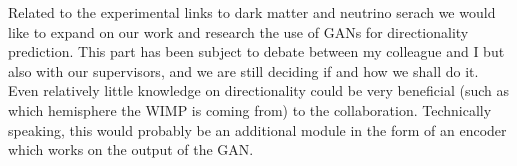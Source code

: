 \documentclass[11pt]{article} %
\begin{document}
Related to the experimental links to dark matter and neutrino serach we would like to expand on our work and research the use of GANs for directionality \cite{mayet2016review} prediction. This part has been subject to debate between my colleague and I but also with our supervisors, and we are still deciding if and how we shall do it. Even relatively little knowledge on directionality could be very beneficial (such as which hemisphere the WIMP is coming from) to the collaboration. Technically speaking, this would probably be an additional module in the form of an encoder which works on the output of the GAN.
\newline



\newpage
\printbibliography
\end{document}

